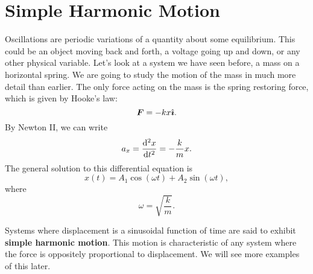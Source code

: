 \documentclass[../classical_mechanics.tex]{subfiles}
\begin{document}
    \section{Simple Harmonic Motion}\label{sec:simple-harmonic-motion}
        Oscillations are periodic variations of a quantity about some equilibrium.
        This could be an object moving back and forth, a voltage going up and down, or any other physical variable.
        Let's look at a system we have seen before, a mass on a horizontal spring.
        We are going to study the motion of the mass in much more detail than earlier.
        The only force acting on the mass is the spring restoring force, which is given by Hooke's law:
        \begin{equation}
            \boldsymbol{F}=-kx\hat{\boldsymbol{\imath}}.
        \end{equation}
        By Newton II, we can write
        \begin{equation}\label{eq:SHM-spring}
            a_x=\dv[2]{x}{t}=-\frac{k}{m}x.
        \end{equation}
        The general solution to this differential equation is
        \begin{equation}
            x(t)=A_1\cos(\omega t)+A_2\sin(\omega t),
        \end{equation}
        where
        \begin{equation}
            \omega=\sqrt{\frac{k}{m}}.
        \end{equation}

        Systems where displacement is a sinusoidal function of time are said to exhibit \textbf{simple harmonic motion}.
        This motion is characteristic of any system where the force is oppositely proportional to displacement.
        We will see more examples of this later.
\end{document}
